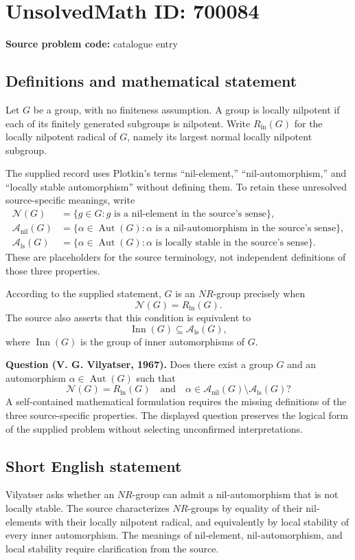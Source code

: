 \documentclass[11pt]{article}
\begin{document}
\section*{UnsolvedMath ID: 700084}
\textbf{Source problem code:} catalogue entry
\subsection{Definitions and mathematical statement}
Let \(G\) be a group, with no finiteness assumption. A group is locally nilpotent if each of its finitely generated subgroups is nilpotent. Write \(R_{\mathrm{ln}}(G)\) for the locally nilpotent radical of \(G\), namely its largest normal locally nilpotent subgroup.

The supplied record uses Plotkin's terms ``nil-element,'' ``nil-automorphism,'' and ``locally stable automorphism'' without defining them. To retain these unresolved source-specific meanings, write
\[
\begin{aligned}
\mathcal N(G)&=\{g\in G:g\text{ is a nil-element in the source's sense}\},\\
\mathcal A_{\mathrm{nil}}(G)&=\{\alpha\in\operatorname{Aut}(G):\alpha\text{ is a nil-automorphism in the source's sense}\},\\
\mathcal A_{\mathrm{ls}}(G)&=\{\alpha\in\operatorname{Aut}(G):\alpha\text{ is locally stable in the source's sense}\}.
\end{aligned}
\]
These are placeholders for the source terminology, not independent definitions of those three properties.

According to the supplied statement, \(G\) is an \(NR\)-group precisely when
\[
\mathcal N(G)=R_{\mathrm{ln}}(G).
\]
The source also asserts that this condition is equivalent to
\[
\operatorname{Inn}(G)\subseteq\mathcal A_{\mathrm{ls}}(G),
\]
where \(\operatorname{Inn}(G)\) is the group of inner automorphisms of \(G\).

\textbf{Question (V. G. Vilyatser, 1967).} Does there exist a group \(G\) and an automorphism \(\alpha\in\operatorname{Aut}(G)\) such that
\[
\mathcal N(G)=R_{\mathrm{ln}}(G)
\quad\text{and}\quad
\alpha\in\mathcal A_{\mathrm{nil}}(G)\setminus\mathcal A_{\mathrm{ls}}(G)?
\]
A self-contained mathematical formulation requires the missing definitions of the three source-specific properties. The displayed question preserves the logical form of the supplied problem without selecting unconfirmed interpretations.
\subsection{Short English statement}
Vilyatser asks whether an \(NR\)-group can admit a nil-automorphism that is not locally stable. The source characterizes \(NR\)-groups by equality of their nil-elements with their locally nilpotent radical, and equivalently by local stability of every inner automorphism. The meanings of nil-element, nil-automorphism, and local stability require clarification from the source.
\end{document}
